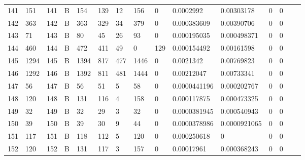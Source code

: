 \begin{longtable}{lllllllllllllll}
	141 & 151               & 141 & B   & 154               & 139               & 12                & 156  & 0          & 0.0002992      & 0.00303178     & 0             & 0            \\
	142 & 363               & 142 & B   & 363               & 329               & 34                & 379  & 0          & 0.000383609    & 0.00390706     & 0             & 0            \\
	143 & 71                & 143 & B   & 80                & 45                & 26                & 93   & 0          & 0.000195035    & 0.000498371    & 0             & 0            \\
	144 & 460               & 144 & B   & 472               & 411               & 49                & 0    & 129        & 0.000154492    & 0.00161598     & 0             & 0            \\
	145 & 1294              & 145 & B   & 1394              & 817               & 477               & 1446 & 0          & 0.0021342      & 0.00769823     & 0             & 0            \\
	146 & 1292              & 146 & B   & 1392              & 811               & 481               & 1444 & 0          & 0.00212047     & 0.00733341     & 0             & 0            \\
	147 & 56                & 147 & B   & 56                & 51                & 5                 & 58   & 0          & 0.0000441196   & 0.000202767    & 0             & 0            \\
	148 & 120               & 148 & B   & 131               & 116               & 4                 & 158  & 0          & 0.000117875    & 0.000473325    & 0             & 0            \\
	149 & 32                & 149 & B   & 32                & 29                & 3                 & 32   & 0          & 0.0000381945   & 0.000540943    & 0             & 0            \\
	150 & 39                & 150 & B   & 39                & 30                & 9                 & 44   & 0          & 0.0000378986   & 0.0000921065   & 0             & 0            \\
	151 & 117               & 151 & B   & 118               & 112               & 5                 & 120  & 0          & 0.000250618    & 0              & 0             & 0            \\
	152 & 120               & 152 & B   & 131               & 117               & 3                 & 157  & 0          & 0.00017961     & 0.000368243    & 0             & 0            \\

\end{longtable}

